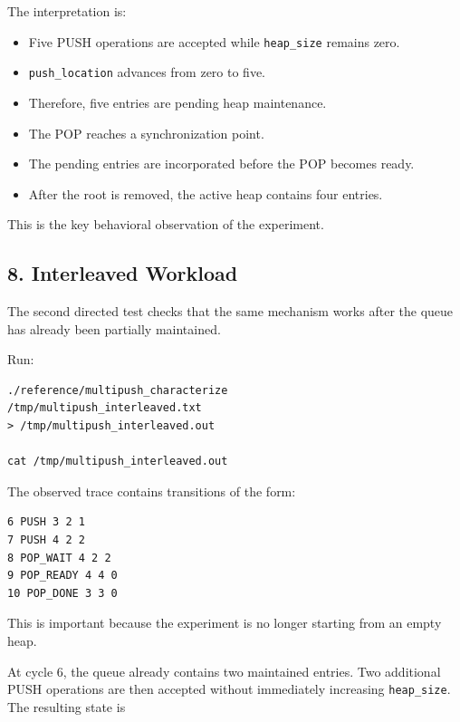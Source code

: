 \documentclass[11pt,a4paper]{article}
\begin{document}
The interpretation is:

\begin{itemize}
\item Five PUSH operations are accepted while
\texttt{heap_size} remains zero.

\item \texttt{push\_location} advances from zero to five.

\item Therefore, five entries are pending heap maintenance.

\item The POP reaches a synchronization point.

\item The pending entries are incorporated before the POP becomes
ready.

\item After the root is removed, the active heap contains four entries.


\end{itemize}

This is the key behavioral observation of the experiment.

\subsection{8. Interleaved Workload}

The second directed test checks that the same mechanism works after the
queue has already been partially maintained.

Run:

\begin{lstlisting}
./reference/multipush_characterize
/tmp/multipush_interleaved.txt
> /tmp/multipush_interleaved.out

cat /tmp/multipush_interleaved.out
\end{lstlisting}

The observed trace contains transitions of the form:

\begin{lstlisting}
6 PUSH 3 2 1
7 PUSH 4 2 2
8 POP_WAIT 4 2 2
9 POP_READY 4 4 0
10 POP_DONE 3 3 0
\end{lstlisting}

This is important because the experiment is no longer starting from an
empty heap.

At cycle 6, the queue already contains two maintained entries. Two
additional PUSH operations are then accepted without immediately
increasing \texttt{heap_size}. The resulting state is
\end{document}
